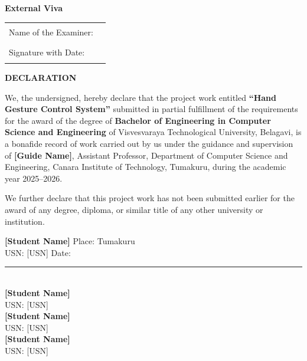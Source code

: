 \documentclass[12pt,a4paper]{report}
\begin{document}
\vspace{1cm}

\begin{center}
\textbf{External Viva}\\
\vspace{1cm}
\begin{tabular}{ll}
Name of the Examiner: & \rule{6cm}{0.4pt}\\[1cm]
Signature with Date: & \rule{6cm}{0.4pt}\\
\end{tabular}
\end{center}

\newpage
\thispagestyle{frontmatter}
\begin{center}
    {\LARGE \textbf{DECLARATION}\par}
\end{center}

\vspace{1cm}

We, the undersigned, hereby declare that the project work entitled \textbf{``Hand Gesture Control System''} submitted in partial fulfillment of the requirements for the award of the degree of \textbf{Bachelor of Engineering in Computer Science and Engineering} of Visvesvaraya Technological University, Belagavi, is a bonafide record of work carried out by us under the guidance and supervision of \textbf{[Guide Name]}, Assistant Professor, Department of Computer Science and Engineering, Canara Institute of Technology, Tumakuru, during the academic year 2025--2026.

\vspace{1cm}

We further declare that this project work has not been submitted earlier for the award of any degree, diploma, or similar title of any other university or institution.

\vspace{2cm}

\begin{flushleft}
\textbf{[Student Name]} \hfill Place: Tumakuru\\
USN: [USN] \hfill Date: \rule{3cm}{0.4pt}\\[1cm]

\textbf{[Student Name]} \hfill \\
USN: [USN] \hfill \\[1cm]

\textbf{[Student Name]} \hfill \\
USN: [USN] \hfill \\[1cm]

\textbf{[Student Name]} \hfill \\
USN: [USN] \hfill \\
\end{flushleft}
\end{document}
